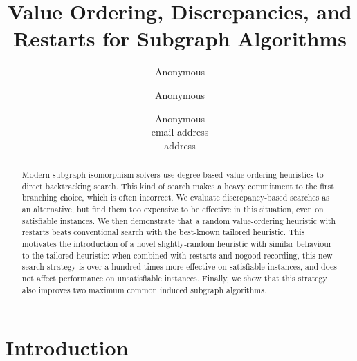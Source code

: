 \documentclass[letterpaper]{article} %
\title{Value Ordering, Discrepancies, and Restarts for Subgraph Algorithms}
\author{Anonymous \and Anonymous \and Anonymous \\ email address \\ address}
\begin{document}
\maketitle

\begin{abstract}
    Modern subgraph isomorphism solvers use degree-based value-ordering heuristics to direct
    backtracking search. This kind of search makes a heavy commitment to the first branching choice,
    which is often incorrect. We evaluate discrepancy-based searches as an alternative, but find
    them too expensive to be effective in this situation, even on satisfiable instances. We then
    demonstrate that a random value-ordering heuristic with restarts beats conventional search with
    the best-known tailored heuristic. This motivates the introduction of a novel slightly-random
    heuristic with similar behaviour to the tailored heuristic: when combined with restarts and
    nogood recording, this new search strategy is over a hundred times more effective on satisfiable
    instances, and does not affect performance on unsatisfiable instances.  Finally, we show that
    this strategy also improves two maximum common induced subgraph algorithms.
\end{abstract}

\section{Introduction}
\end{document}
